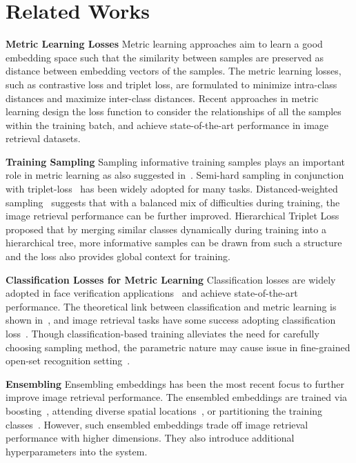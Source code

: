 \documentclass{bmvc2k}
\begin{document}
\section{Related Works}
\label{subsec:related_metric}
\textbf{Metric Learning Losses}
Metric learning approaches aim to learn a good embedding space such that the similarity between samples are preserved as distance between embedding vectors of the samples. The metric learning losses, such as contrastive loss\cite{siamese} and triplet loss\cite{triplet}, are formulated to minimize intra-class distances and maximize inter-class distances. Recent approaches in metric learning design the loss function to consider the relationships of all the samples within the training batch\cite{songCVPR16,npairNIPS2016,angular,samplingmatters,UstinovaNIPS16}, and achieve state-of-the-art performance in image retrieval datasets\cite{cub200,cars196,songCVPR16}. 

\textbf{Training Sampling} 
Sampling informative training samples plays an important role in metric learning as also suggested in~\cite{facenet,samplingmatters}. Semi-hard sampling in conjunction with triplet-loss~\cite{facenet} has been widely adopted for many tasks. Distanced-weighted sampling~\cite{samplingmatters} suggests that with a balanced mix of difficulties during training, the image retrieval performance can be further improved. Hierarchical Triplet Loss~\cite{htl} proposed that by merging similar classes dynamically during training into a hierarchical tree, more informative samples can be drawn from such a structure and the loss also provides global context for training.

\textbf{Classification Losses for Metric Learning}
Classification losses are widely adopted in face verification applications~\cite{Liu2017SphereFaceDH,Wang2018AdditiveMS,Wang2018CosFaceLM} and achieve state-of-the-art performance. The theoretical link between classification and metric learning is shown in~\cite{nofusslearning}, and image retrieval tasks have some success adopting classification loss~\cite{nofusslearning,Xuan2018DeepRE}. Though classification-based training alleviates the need for carefully choosing sampling method, the parametric nature may cause issue in fine-grained open-set recognition setting~\cite{scalablenca}.

\textbf{Ensembling}
Ensembling embeddings has been the most recent focus to further improve image retrieval performance. The ensembled embeddings are trained via boosting~\cite{abier}, attending diverse spatial locations~\cite{attention_metric}, or partitioning the training classes~\cite{Xuan2018DeepRE}. However, such ensembled embeddings trade off image retrieval performance with higher dimensions. They also introduce additional hyperparameters into the system.
\end{document}
